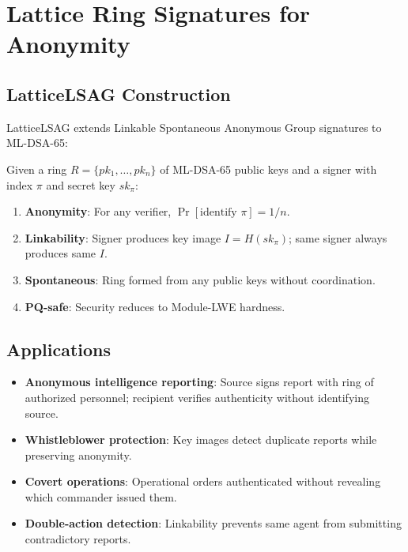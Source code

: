 \documentclass[11pt,letterpaper]{article}
\begin{document}
\section{Lattice Ring Signatures for Anonymity}

\subsection{LatticeLSAG Construction}

LatticeLSAG extends Linkable Spontaneous Anonymous Group signatures to ML-DSA-65:

\begin{definition}[LatticeLSAG]
Given a ring $R = \{pk_1, \ldots, pk_n\}$ of ML-DSA-65 public keys and a signer with index $\pi$ and secret key $sk_\pi$:
\begin{enumerate}
\item \textbf{Anonymity}: For any verifier, $\Pr[\text{identify } \pi] = 1/n$.
\item \textbf{Linkability}: Signer produces key image $I = H(sk_\pi)$; same signer always produces same $I$.
\item \textbf{Spontaneous}: Ring formed from any public keys without coordination.
\item \textbf{PQ-safe}: Security reduces to Module-LWE hardness.
\end{enumerate}
\end{definition}

\subsection{Applications}

\begin{itemize}
\item \textbf{Anonymous intelligence reporting}: Source signs report with ring of authorized personnel; recipient verifies authenticity without identifying source.
\item \textbf{Whistleblower protection}: Key images detect duplicate reports while preserving anonymity.
\item \textbf{Covert operations}: Operational orders authenticated without revealing which commander issued them.
\item \textbf{Double-action detection}: Linkability prevents same agent from submitting contradictory reports.
\end{itemize}
\end{document}
